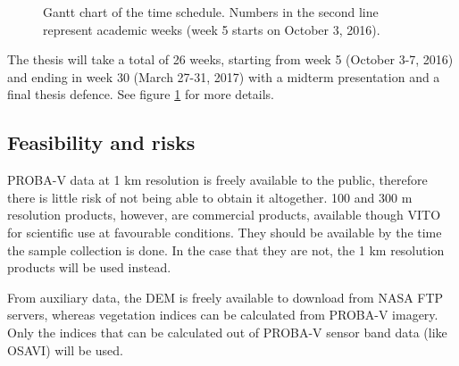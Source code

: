 \documentclass[a4paper,10pt]{article}
\begin{document}
\begin{figure}
  \caption{Gantt chart of the time schedule. Numbers in the second line represent academic weeks (week 5 starts on October 3, 2016).}
  \label{fig-gantt}
\end{figure}

The thesis will take a total of 26 weeks, starting from week 5 (October 3-7, 2016) and ending in week 30 (March 27-31, 2017) with a midterm presentation and a final thesis defence. See figure \ref{fig-gantt} for more details.

\subsection{Feasibility and risks}

PROBA-V data at 1 km resolution is freely available to the public, therefore there is little risk of not being able to obtain it altogether. 100 and 300 m resolution products, however, are commercial products, available though VITO for scientific use at favourable conditions. They should be available by the time the sample collection is done. In the case that they are not, the 1 km resolution products will be used instead.

From auxiliary data, the DEM is freely available to download from NASA FTP servers, whereas vegetation indices can be calculated from PROBA-V imagery. Only the indices that can be calculated out of PROBA-V sensor band data (like OSAVI) will be used.
\end{document}

